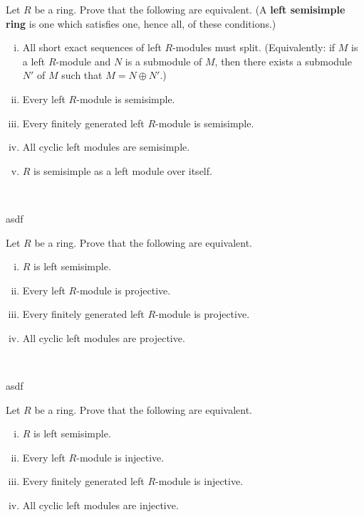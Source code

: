 \nq
\begin{exr}[title=Theorem 2.5] %
	Let $R$ be a ring. Prove that the following are equivalent.
	(A \textbf{left semisimple ring} is one which satisfies one, hence all, of these conditions.) \vspace{-0.2in}
	\begin{enumerate}[i)]
		\item All short exact sequences of left $R$-modules must split.
			(Equivalently: if $M$ is a left $R$-module and
			$N$ is a submodule of $M$, then there exists a submodule $N'$ of $M$ such that
			$M=N\oplus N'$.)
		\item Every left $R$-module is semisimple.
		\item Every finitely generated left $R$-module is semisimple.
		\item All cyclic left modules are semisimple.
		\item $R$ is semisimple as a left module over itself.
	\end{enumerate}
\end{exr} \

\begin{pf}
	asdf
\end{pf}


\nq
\begin{exr}[title=Theorem 2.8] %
	Let $R$ be a ring. Prove that the following are equivalent.
	\begin{enumerate}[i)]
		\item $R$ is left semisimple.
		\item Every left $R$-module is projective.
		\item Every finitely generated left $R$-module is projective.
		\item All cyclic left modules are projective.
	\end{enumerate}
\end{exr} \

\begin{pf}
	asdf
\end{pf}


\nq
\begin{exr}[title=Theorem 2.9] %
	Let $R$ be a ring. Prove that the following are equivalent.
	\begin{enumerate}[i)]
		\item $R$ is left semisimple.
		\item Every left $R$-module is injective.
		\item Every finitely generated left $R$-module is injective.
		\item All cyclic left modules are injective.
	\end{enumerate}
\end{exr} \

